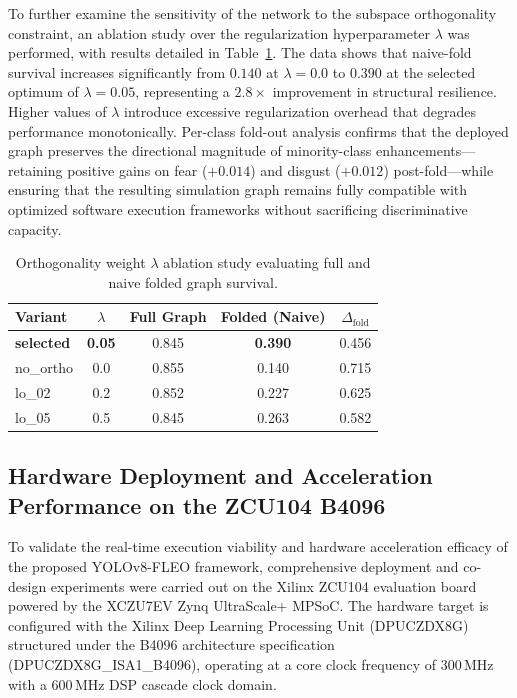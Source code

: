 \documentclass[algorithms,article,submit,moreauthors]{Definitions/mdpi}
\begin{document}
To further examine the sensitivity of the network to the subspace orthogonality constraint, an ablation study over the regularization hyperparameter $\lambda$ was performed, with results detailed in Table~\ref{tab:ablation}. The data shows that naive-fold survival increases significantly from $0.140$ at $\lambda = 0.0$ to $0.390$ at the selected optimum of $\lambda = 0.05$, representing a $2.8\times$ improvement in structural resilience. Higher values of $\lambda$ introduce excessive regularization overhead that degrades performance monotonically. Per-class fold-out analysis confirms that the deployed graph preserves the directional magnitude of minority-class enhancements—retaining positive gains on fear ($+0.014$) and disgust ($+0.012$) post-fold—while ensuring that the resulting simulation graph remains fully compatible with optimized software execution frameworks without sacrificing discriminative capacity.

\begin{table}[h!]
\centering
\caption{Orthogonality weight $\lambda$ ablation study evaluating full and naive folded graph survival.}
\label{tab:ablation}
\setlength{\tabcolsep}{6pt}\renewcommand{\arraystretch}{1.2}
\begin{tabular}{lcccc}
\toprule
Variant & $\lambda$ & Full Graph & Folded (Naive) & $\Delta_{\mathrm{fold}}$\\
\midrule
\textbf{selected} & \textbf{0.05} & 0.845 & \textbf{0.390} & 0.456\\
no\_ortho & 0.0 & 0.855 & 0.140 & 0.715\\
lo\_02 & 0.2 & 0.852 & 0.227 & 0.625\\
lo\_05 & 0.5 & 0.845 & 0.263 & 0.582\\
\bottomrule
\end{tabular}
\end{table}


\subsection{Hardware Deployment and Acceleration Performance on the ZCU104 B4096}
\label{sec:deploy-results}

To validate the real-time execution viability and hardware acceleration efficacy of the proposed YOLOv8-FLEO framework, comprehensive deployment and co-design experiments were carried out on the Xilinx ZCU104 evaluation board powered by the XCZU7EV Zynq UltraScale+ MPSoC. The hardware target is configured with the Xilinx Deep Learning Processing Unit (DPUCZDX8G) structured under the B4096 architecture specification (DPUCZDX8G\_ISA1\_B4096), operating at a core clock frequency of $300\,\text{MHz}$ with a $600\,\text{MHz}$ DSP cascade clock domain. 
\end{document}
